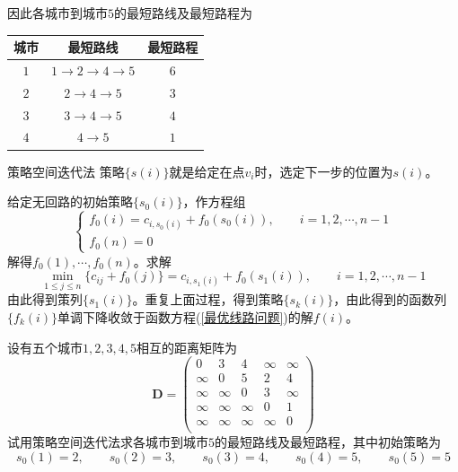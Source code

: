 \documentclass[lang = cn, scheme = chinese, thmcnt = section]{elegantbook}
\begin{document}
\begin{solution}
	因此各城市到城市$5$的最短路线及最短路程为
	\begin{table}[H]
		\centering
		\begin{tabular}{ccc}
			\toprule
			\textbf{城市} & \textbf{最短路线} & \textbf{最短路程} \\
			\midrule
			$1$ & $1\to 2\to 4\to 5$ & $6$ \\
			$2$ & $2\to 4 \to 5$ & $3$ \\
			$3$ & $3\to 4\to 5$ & $4$ \\
			$4$ & $4\to 5$ & $1$ \\
			\bottomrule
		\end{tabular}
	\end{table}
\end{solution}

\begin{theorem}{策略空间迭代法}
	策略$\{ s(i) \}$就是给定在点$v_i$时，选定下一步的位置为$s(i)$。
	
	给定无回路的初始策略$\{ s_0(i) \}$，作方程组%
	$$
	\begin{cases}
		f_0(i)=c_{i,s_0(i)}+f_0(s_0(i)),\qquad i=1,2,\cdots,n-1\\
		f_0(n)=0
	\end{cases}
	$$
	解得$f_0(1),\cdots,f_0(n)$。求解%
	$$
	\min_{1\le  j \le n}\{ c_{ij}+f_0(j) \}=c_{i,s_1(i)}+f_0(s_1(i)),\qquad i=1,2,\cdots,n-1
	$$
	由此得到策列$\{ s_1(i) \}$。重复上面过程，得到策略$\{ s_k(i) \}$，由此得到的函数列$\{ f_k(i) \}$单调下降收敛于函数方程(\ref{最优线路问题})的解$f(i)$。
\end{theorem}

\begin{example}
	设有五个城市$1,2,3,4,5$相互的距离矩阵为
	$$
	\boldsymbol{D}=\begin{pmatrix}
		0 & 3 & 4 & \infty & \infty \\
		\infty & 0 & 5 & 2 & 4 \\
		\infty & \infty & 0 & 3 & \infty \\
		\infty & \infty & \infty & 0 & 1 \\
		\infty & \infty & \infty & \infty & 0 \\
	\end{pmatrix}
	$$
	试用策略空间迭代法求各城市到城市$5$的最短路线及最短路程，其中初始策略为%
	$$
	s_0(1)=2,\qquad
	s_0(2)=3,\qquad
	s_0(3)=4,\qquad
	s_0(4)=5,\qquad
	s_0(5)=5
	$$
\end{example}
\end{document}
